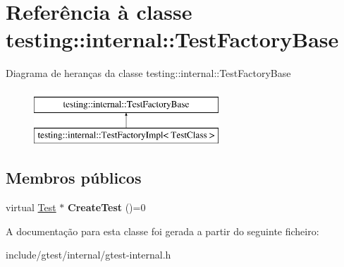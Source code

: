 \hypertarget{classtesting_1_1internal_1_1TestFactoryBase}{\section{Referência à classe testing\-:\-:internal\-:\-:Test\-Factory\-Base}
\label{classtesting_1_1internal_1_1TestFactoryBase}
}
Diagrama de heranças da classe testing\-:\-:internal\-:\-:Test\-Factory\-Base\begin{figure}[H]
\begin{center}
\leavevmode
\includegraphics[height=2.000000cm]{classtesting_1_1internal_1_1TestFactoryBase}
\end{center}
\end{figure}
\subsection*{Membros públicos}
\begin{DoxyCompactItemize}
\item 
\hypertarget{classtesting_1_1internal_1_1TestFactoryBase_a07ac3ca0b196cdb092da0bb186b7c030}{virtual \hyperlink{classtesting_1_1Test}{Test} $\ast$ {\bfseries Create\-Test} ()=0}\label{classtesting_1_1internal_1_1TestFactoryBase_a07ac3ca0b196cdb092da0bb186b7c030}

\end{DoxyCompactItemize}


A documentação para esta classe foi gerada a partir do seguinte ficheiro\-:\begin{DoxyCompactItemize}
\item 
include/gtest/internal/gtest-\/internal.\-h\end{DoxyCompactItemize}
